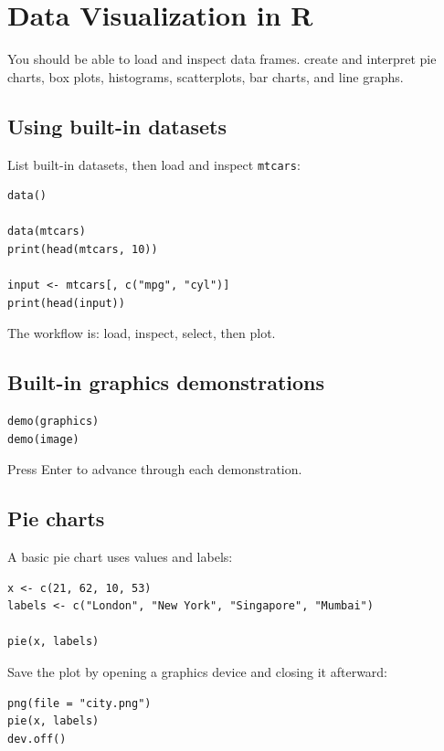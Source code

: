 \chapter{Data Visualization in R}
\label{chap:visualization}

\chapterguide
  {You should be able to load and inspect data frames.}
  {create and interpret pie charts, box plots, histograms, scatterplots, bar charts, and line graphs.}

\section{Using built-in datasets}

List built-in datasets, then load and inspect \texttt{mtcars}:

\begin{lstlisting}[style=dsr]
data()

data(mtcars)
print(head(mtcars, 10))

input <- mtcars[, c("mpg", "cyl")]
print(head(input))
\end{lstlisting}

The workflow is: load, inspect, select, then plot.

\section{Built-in graphics demonstrations}

\begin{lstlisting}[style=dsr]
demo(graphics)
demo(image)
\end{lstlisting}

Press Enter to advance through each demonstration.

\section{Pie charts}

A basic pie chart uses values and labels:

\begin{lstlisting}[style=dsr]
x <- c(21, 62, 10, 53)
labels <- c("London", "New York", "Singapore", "Mumbai")

pie(x, labels)
\end{lstlisting}

Save the plot by opening a graphics device and closing it afterward:

\begin{lstlisting}[style=dsr]
png(file = "city.png")
pie(x, labels)
dev.off()
\end{lstlisting}

